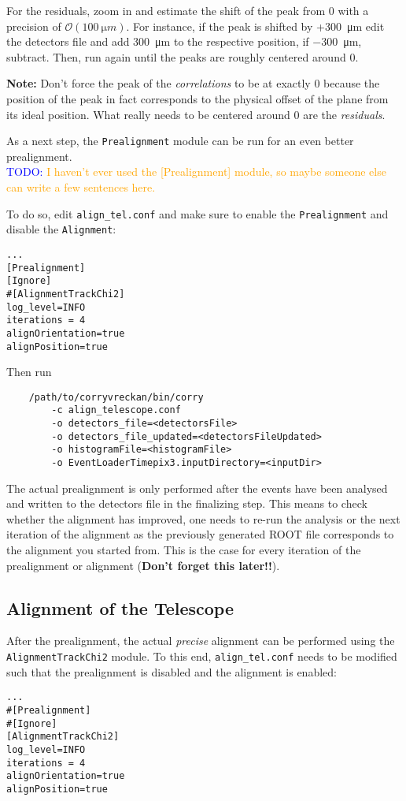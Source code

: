 For the residuals, zoom in and estimate the shift of the peak from 0 with a precision of $\mathcal{O}(\SI{100}{\micro m})$. 
For instance, if the peak is shifted by +\SI{+300}{\micro m} edit the detectors file and add \SI{+300}{\micro m} to the respective position, if \SI{-300}{\micro m}, subtract.
Then, run again until the peaks are roughly centered around 0.

\textbf{Note:} Don't force the peak of the \textit{correlations} to be at exactly 0 because the position of the peak in fact corresponds to the physical offset of the plane from its ideal position. What really needs to be centered around 0 are the \textit{residuals}.

As a next step, the \texttt{Prealignment} module can be run for an even better prealignment.\\
\textcolor{blue}{TODO: }\textcolor{orange}{I haven't ever used the [Prealignment] module, so maybe someone else can write a few sentences here.}

To do so, edit \texttt{align\_tel.conf} and make sure to enable the \texttt{Prealignment} and disable the \texttt{Alignment}:
\begin{verbatim}
...
[Prealignment]
[Ignore]
#[AlignmentTrackChi2]
log_level=INFO
iterations = 4
alignOrientation=true
alignPosition=true
\end{verbatim}

Then run
\begin{verbatim}
    /path/to/corryvreckan/bin/corry 
        -c align_telescope.conf
    	-o detectors_file=<detectorsFile> 
    	-o detectors_file_updated=<detectorsFileUpdated> 
    	-o histogramFile=<histogramFile> 
    	-o EventLoaderTimepix3.inputDirectory=<inputDir>
\end{verbatim}

The actual prealignment is only performed after the events have been analysed and written to the detectors file in the finalizing step. 
This means to check whether the alignment has improved, one needs to re-run the analysis or the next iteration of the alignment as the previously generated ROOT file corresponds to the alignment you started from.
This is the case for every iteration of the prealignment or alignment (\textbf{Don't forget this later!!}).

\subsection*{Alignment of the Telescope}
After the prealignment, the actual \textit{precise} alignment can be performed using the \texttt{AlignmentTrackChi2} module.
To this end, \texttt{align\_tel.conf} needs to be modified such that the prealignment is disabled and the alignment is enabled:
\begin{verbatim}
...
#[Prealignment]
#[Ignore]
[AlignmentTrackChi2]
log_level=INFO
iterations = 4
alignOrientation=true
alignPosition=true
\end{verbatim}

